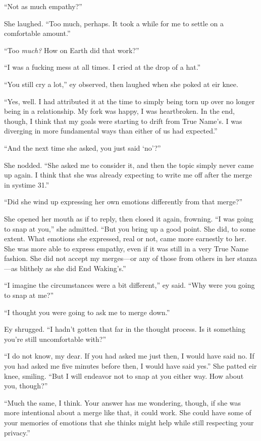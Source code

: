 ``Not as much empathy?''

She laughed. ``Too much, perhaps. It took a while for me to settle on a comfortable amount.''

``Too \emph{much?} How on Earth did that work?''

``I was a fucking mess at all times. I cried at the drop of a hat.''

``You still cry a lot,'' ey observed, then laughed when she poked at eir knee.

``Yes, well. I had attributed it at the time to simply being torn up over no longer being in a relationship. My fork was happy, I was heartbroken. In the end, though, I think that my goals were starting to drift from True Name's. I was diverging in more fundamental ways than either of us had expected.''

``And the next time she asked, you just said `no'?''

She nodded. ``She asked me to consider it, and then the topic simply never came up again. I think that she was already expecting to write me off after the merge in systime 31.''

``Did she wind up expressing her own emotions differently from that merge?''

She opened her mouth as if to reply, then closed it again, frowning. ``I was going to snap at you,'' she admitted. ``But you bring up a good point. She did, to some extent. What emotions she expressed, real or not, came more earnestly to her. She was more able to express empathy, even if it was still in a very True Name fashion. She did not accept my merges—or any of those from others in her stanza—as blithely as she did End Waking's.''

``I imagine the circumstances were a bit different,'' ey said. ``Why were you going to snap at me?''

``I thought you were going to ask me to merge down.''

Ey shrugged. ``I hadn't gotten that far in the thought process. Is it something you're still uncomfortable with?''

``I do not know, my dear. If you had asked me just then, I would have said no. If you had asked me five minutes before then, I would have said yes.'' She patted eir knee, smiling. ``But I will endeavor not to snap at you either way. How about you, though?''

``Much the same, I think. Your answer has me wondering, though, if she was more intentional about a merge like that, it could work. She could have some of your memories of emotions that she thinks might help while still respecting your privacy.''

